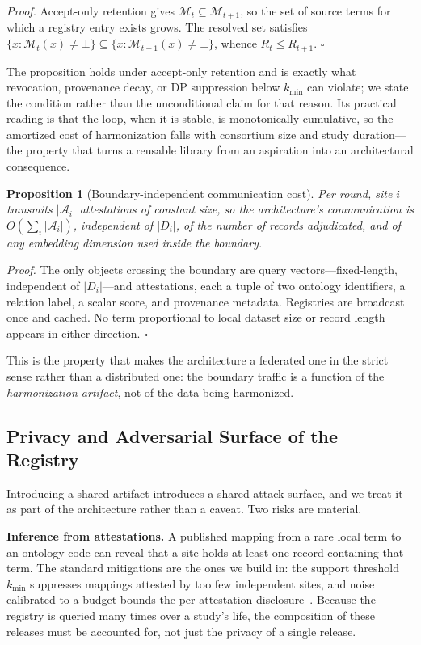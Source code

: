 \documentclass[conference]{IEEEtran}
\newcommand{\reg}{\mathcal{M}}
\newcommand{\att}{\mathcal{A}}
\newtheorem{proposition}{Proposition}
\begin{document}
\noindent\textit{Proof.} Accept-only retention gives $\reg_t \subseteq \reg_{t+1}$, so the set of source terms for which a registry entry exists grows. The resolved set satisfies $\{x : \reg_t(x) \neq \bot\} \subseteq \{x : \reg_{t+1}(x) \neq \bot\}$, whence $R_t \le R_{t+1}$. \hfill$\square$

The proposition holds under accept-only retention and is exactly what revocation, provenance decay, or DP suppression below $k_{\min}$ can violate; we state the condition rather than the unconditional claim for that reason. Its practical reading is that the loop, when it is stable, is monotonically cumulative, so the amortized cost of harmonization falls with consortium size and study duration---the property that turns a reusable library from an aspiration into an architectural consequence.

\begin{proposition}[Boundary-independent communication cost]
\label{prop:comm}
Per round, site $i$ transmits $|\att_i|$ attestations of constant size, so the architecture's communication is $O\!\left(\sum_i |\att_i|\right)$, independent of $|D_i|$, of the number of records adjudicated, and of any embedding dimension used inside the boundary.
\end{proposition}

\noindent\textit{Proof.} The only objects crossing the boundary are query vectors---fixed-length, independent of $|D_i|$---and attestations, each a tuple of two ontology identifiers, a relation label, a scalar score, and provenance metadata. Registries are broadcast once and cached. No term proportional to local dataset size or record length appears in either direction. \hfill$\square$

This is the property that makes the architecture a federated one in the strict sense rather than a distributed one: the boundary traffic is a function of the \emph{harmonization artifact}, not of the data being harmonized.

\subsection{Privacy and Adversarial Surface of the Registry}

Introducing a shared artifact introduces a shared attack surface, and we treat it as part of the architecture rather than a caveat. Two risks are material.

\textbf{Inference from attestations.} A published mapping from a rare local term to an ontology code can reveal that a site holds at least one record containing that term. The standard mitigations are the ones we build in: the support threshold $k_{\min}$ suppresses mappings attested by too few independent sites, and noise calibrated to a budget bounds the per-attestation disclosure~\cite{b24,b25}. Because the registry is queried many times over a study's life, the composition of these releases must be accounted for, not just the privacy of a single release.
\end{document}
